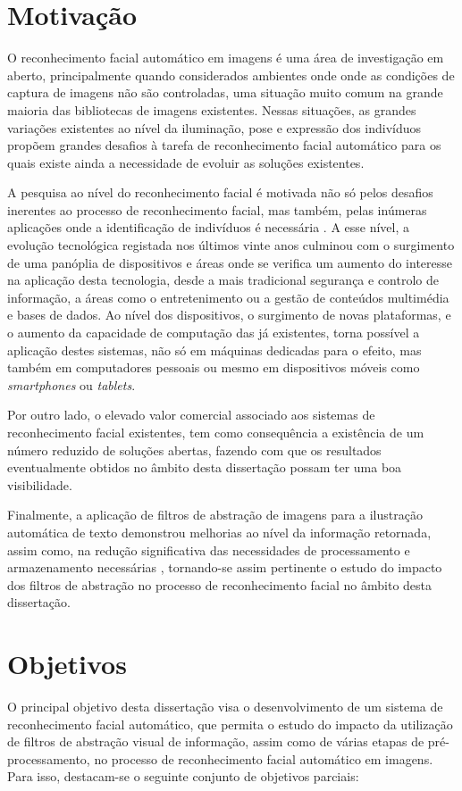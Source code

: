 \section{Motivação} \label{sec:motivation}
O reconhecimento facial automático em imagens é uma área de investigação em aberto, principalmente quando considerados ambientes onde onde as condições de captura de imagens não são controladas, uma situação muito comum na grande maioria das bibliotecas de imagens existentes. Nessas situações, as grandes variações existentes ao nível da iluminação, pose e expressão dos indivíduos propõem grandes desafios à tarefa de reconhecimento facial automático para os quais existe ainda a necessidade de evoluir as soluções existentes.

A pesquisa ao nível do reconhecimento facial é motivada não só pelos desafios inerentes ao processo de reconhecimento facial, mas também, pelas inúmeras aplicações onde a identificação de indivíduos é necessária \citep{Li2011}. A esse nível, a evolução tecnológica registada nos últimos vinte anos culminou com o surgimento de uma panóplia de dispositivos e áreas onde se verifica um aumento do interesse na aplicação desta tecnologia, desde a mais tradicional segurança e controlo de informação, a áreas como o entretenimento ou a gestão de conteúdos multimédia e bases de dados. Ao nível dos dispositivos, o surgimento de novas plataformas, e o aumento da capacidade de computação das já existentes, torna possível a aplicação destes sistemas, não só em máquinas dedicadas para o efeito, mas  também em computadores pessoais ou mesmo em dispositivos móveis como \textit{smartphones} ou \textit{tablets}.

Por outro lado, o elevado valor comercial associado aos sistemas de reconhecimento facial existentes, tem como  consequência a existência de um número reduzido de soluções abertas, fazendo com que os resultados eventualmente obtidos no âmbito desta dissertação possam ter uma boa visibilidade.

Finalmente, a aplicação de filtros de abstração de imagens para a ilustração automática de texto demonstrou melhorias ao  nível da informação retornada, assim como, na redução significativa das necessidades de processamento e armazenamento necessárias \citep{Coelho:2012:IAC:2260641.2260676}, tornando-se assim pertinente o estudo do impacto dos filtros de abstração no processo de reconhecimento facial no âmbito desta dissertação.

\section{Objetivos} \label{sec:objetivosintro}
O principal objetivo desta dissertação visa o desenvolvimento de um sistema de reconhecimento facial automático, que permita o estudo do impacto da utilização de filtros de abstração visual de informação, assim como de várias etapas de pré-processamento, no processo de reconhecimento facial automático em imagens. Para isso, destacam-se o seguinte conjunto de objetivos parciais:

